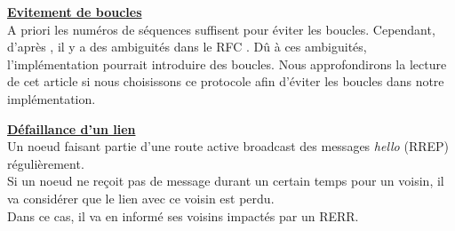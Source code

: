     \vspace{1cm}
    \underline{\textbf{Evitement de boucles}}\\
        A priori les numéros de séquences suffisent pour éviter les boucles. Cependant, d'après \cite{loop_aodv_w}, il y a des
        ambiguités dans le RFC \cite{aodv_w}. Dû à ces ambiguités, l'implémentation pourrait introduire des boucles.
        Nous approfondirons la lecture de cet article si nous choisissons ce protocole afin d'éviter les boucles dans notre implémentation.

    \underline{\textbf{Défaillance d'un lien}}\\
        Un noeud faisant partie d'une route active broadcast des messages \textit{hello} (RREP)
        régulièrement.\\
        Si un noeud ne reçoit pas de message durant un certain temps pour un voisin, il va considérer
        que le lien avec ce voisin est perdu.\\
        Dans ce cas, il va en informé ses voisins impactés par un RERR.